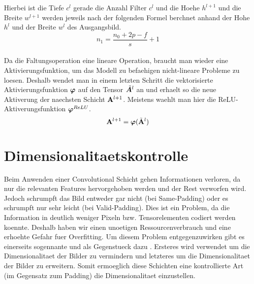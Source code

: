 Hierbei ist die Tiefe $c^l$ gerade die Anzahl Filter $c^l$ und die Hoehe
$h^{l+1}$ und die Breite $w^{l+1}$ werden jeweils nach der folgenden Formel
berchnet anhand der Hohe $h^l$ und der Breite $w^l$ des Ausgangsbild.
\\
\begin{equation}
  n_1 = \frac{n_0 + 2p - f}{s} + 1
\end{equation}
\\
Da die Faltungsoperation eine lineare Operation, braucht man wieder eine
Aktivierungsfunktion, um das Modell zu befaehigen nicht-lineare Probleme zu
loesen.
Deshalb wendet man in einem letzten Schritt die vektorisierte Aktivierungsfunktion
$\bm{\varphi}$ auf den Tensor $\tilde{\bm{A}}^l$ an und erhaelt so die
neue Aktiverung der naechsten Schicht $\mathbf{A}^{l+1}$. Meistens waehlt man hier
die ReLU-Aktiverungsfunktion $\bm{\varphi}^{ReLU}$.
\begin{equation}
  \mathbf{A}^{l+1} = \bm{\varphi}(\tilde{\mathbf{A}}^l)
\end{equation}



\cite{Goodfellow-et-al-2016}

\section{Dimensionalitaetskontrolle}
Beim Anwenden einer Convolutional Schicht gehen Informationen verloren, da nur
die relevanten Features hervorgehoben werden und der Rest verworfen wird. Jedoch
schrumpft das Bild entweder gar nicht (bei Same-Padding) oder es schrumpft nur
sehr leicht (bei Valid-Padding). Dies ist ein Problem, da die Information in
deutlich weniger Pixeln bzw. Tensorelementen codiert werden koennte. Deshalb
haben wir einen unoetigen Ressourcenverbrauch und eine erhoehte Gefahr fuer
Overfitting. Um diesem Problem entgegenzuwirken gibt es einerseits sogennante
 und als Gegenstueck dazu
. Ersteres wird verwendet um die Dimensionalitaet
der Bilder zu vermindern und letzteres um die Dimensionalitaet der Bilder zu
erweitern. Somit ermoeglich diese Schichten eine kontrollierte Art (im Gegensatz zum
Padding) die Dimensionalitaet einzustellen.

